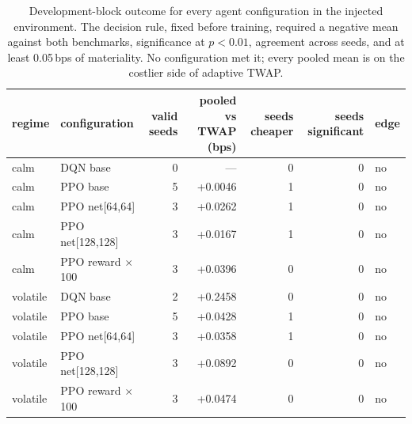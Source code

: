 \begin{table}[htbp]\centering
\caption{Development-block outcome for every agent configuration in the injected
environment. The decision rule, fixed before training, required a negative mean
against both benchmarks, significance at $p<0.01$, agreement across seeds, and at
least 0.05\,bps of materiality. No configuration met it; every pooled mean is on the
costlier side of adaptive TWAP.}
\label{tab:sigext-dev-verdicts}
\small
\begin{tabular}{llrrrrl}
\toprule
regime & configuration & valid seeds & pooled vs TWAP (bps) & seeds cheaper & seeds significant & edge \\
\midrule
calm & DQN base & 0 & --- & 0 & 0 & no \\
calm & PPO base & 5 & +0.0046 & 1 & 0 & no \\
calm & PPO net[64,64] & 3 & +0.0262 & 1 & 0 & no \\
calm & PPO net[128,128] & 3 & +0.0167 & 1 & 0 & no \\
calm & PPO reward $\times$100 & 3 & +0.0396 & 0 & 0 & no \\
volatile & DQN base & 2 & +0.2458 & 0 & 0 & no \\
volatile & PPO base & 5 & +0.0428 & 1 & 0 & no \\
volatile & PPO net[64,64] & 3 & +0.0358 & 1 & 0 & no \\
volatile & PPO net[128,128] & 3 & +0.0892 & 0 & 0 & no \\
volatile & PPO reward $\times$100 & 3 & +0.0474 & 0 & 0 & no \\
\bottomrule
\end{tabular}
\end{table}
